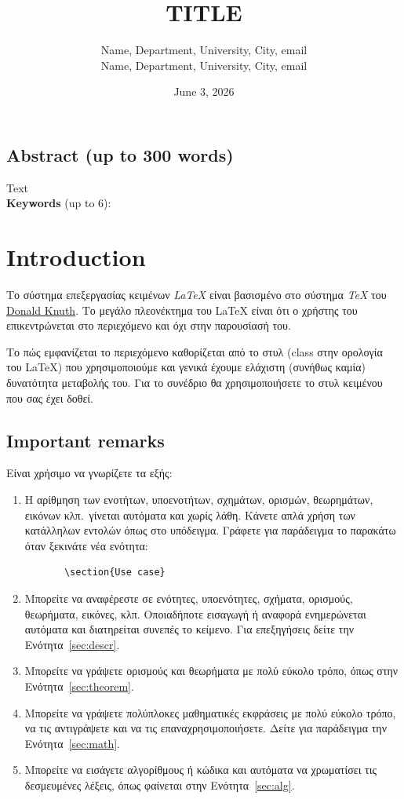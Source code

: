 \documentclass[a4paper,11pt]{article}
\title{
\huge TITLE
}
\author{Name, Department, University, City, email \\
Name, Department, University, City, email}
\date{June 3, 2026}
\begin{document}
\maketitle


%
%
\begin{center}
\section*{Abstract (up to 300 words)}
Text    
\[\]
\textbf{Keywords} (up to 6):
\end{center}

%
%
\section{Introduction}\label{sec:intro}
Το σύστημα επεξεργασίας κειμένων \emph{\LaTeX} \cite{Lamport86} είναι βασισμένο στο σύστημα \emph{\TeX} του \href{https://en.wikipedia.org/wiki/Donald_Knuth}{Donald Knuth}. Το μεγάλο πλεονέκτημα του {\LaTeX} είναι ότι ο χρήστης του επικεντρώνεται στο περιεχόμενο και όχι στην παρουσίασή του. 

Το πώς εμφανίζεται το περιεχόμενο καθορίζεται από το στυλ (class στην ορολογία του \LaTeX) που χρησιμοποιούμε και γενικά έχουμε ελάχιστη (συνήθως καμία) δυνατότητα μεταβολής του. Για το συνέδριο θα χρησιμοποιήσετε το στυλ κειμένου που σας έχει δοθεί.

\subsection{Important remarks}
Είναι χρήσιμο να γνωρίζετε τα εξής:
\begin{enumerate}
    \item Η αρίθμηση των ενοτήτων, υποενοτήτων, σχημάτων, ορισμών, θεωρημάτων, εικόνων κλπ.\ γίνεται αυτόματα και χωρίς λάθη. Κάνετε απλά χρήση των κατάλληλων εντολών όπως στο υπόδειγμα. Γράφετε για παράδειγμα το παρακάτω όταν ξεκινάτε νέα ενότητα: 
    \begin{verbatim}
       \section{Use case}
    \end{verbatim}
    \item Μπορείτε να αναφέρεστε σε ενότητες, υποενότητες, σχήματα, ορισμούς, θεωρήματα, εικόνες, κλπ. Οποιαδήποτε εισαγωγή ή αναφορά ενημερώνεται αυτόματα και διατηρείται συνεπές το κείμενο. Για επεξηγήσεις δείτε την Ενότητα~\ref{sec:descr}.
    \item Μπορείτε να γράψετε ορισμούς και θεωρήματα με πολύ εύκολο τρόπο, όπως στην Ενότητα~\ref{sec:theorem}.
    \item Μπορείτε να γράψετε πολύπλοκες μαθηματικές εκφράσεις με πολύ εύκολο τρόπο, να τις αντιγράψετε και να τις επαναχρησιμοποιήσετε. Δείτε για παράδειγμα την Ενότητα~\ref{sec:math}.  
    \item Μπορείτε να εισάγετε αλγορίθμους ή κώδικα και αυτόματα να χρωματίσει τις δεσμευμένες λέξεις, όπως φαίνεται στην Ενότητα~\ref{sec:alg}. 
\end{enumerate}
\end{document}
